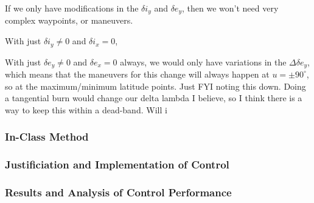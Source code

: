 If we only have modifications in the $\delta i_y$ and $\delta e_y$, then we won't need very complex waypoints, or maneuvers.

With just $\delta i_y \neq 0$ and $\delta i_x = 0$, 

With just $\delta e_y \neq 0$ and $\delta e_x = 0$ always, we would only have variations in the $\Delta \delta e_y$, which means that the maneuvers for this change will always happen at $u = \pm 90^\circ$, so at the maximum/minimum latitude points. Just FYI noting this down.
     Doing a tangential burn would change our delta lambda I believe, so I think there is a way to keep this within a dead-band.
     Will i 



\subsubsection{In-Class Method}

\subsubsection{Justificiation and Implementation of Control}

\subsubsection{Results and Analysis of Control Performance}
